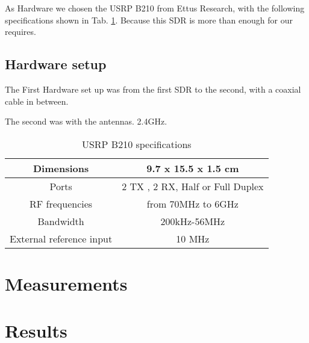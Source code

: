 As Hardware we chosen the USRP B210 from Ettus Research, with the following specifications shown in Tab. \ref{tab:USRP B210 specifications}. Because this SDR is more than enough for our requires.

\subsection{Hardware setup}

The First Hardware set up was from the first SDR to the second, with a coaxial cable in between. 

The second was with the antennas. 2.4GHz. 




\begin{table}[]
	\caption{USRP B210 specifications}
	\begin{tabular}[h]{|c|c|}
		\hline
		Dimensions & 9.7 x 15.5 x 1.5 cm \\
		\hline
		Ports &
2 TX , 2 RX, Half  or Full Duplex\\
		\hline
		RF frequencies & from 70MHz to 6GHz\\
		\hline
		Bandwidth & 200kHz-56MHz\\
		\hline 
		External reference input & 10 MHz \\
		\hline
	\end{tabular}
\label{tab:USRP B210 specifications}
\end{table}


\section{Measurements}



\section{Results}
